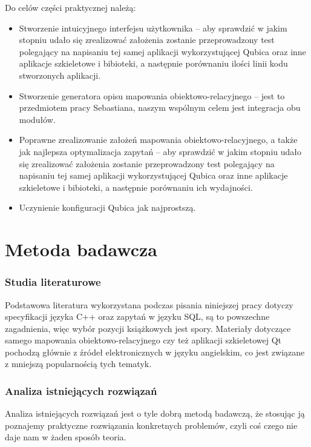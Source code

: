 \documentclass[12pt]{report}
\begin{document}
Do celów części praktycznej należą:

\begin{itemize}
\item Stworzenie intuicyjnego interfejsu użytkownika -- aby sprawdzić w jakim stopniu udało się zrealizować założenia zostanie przeprowadzony test po\-le\-ga\-ją\-cy na napisaniu
tej samej aplikacji wykorzystującej Qubica oraz inne aplikacje szkieletowe i bibioteki, a następnie porównaniu ilości linii kodu stworzonych aplikacji.
\item Stworzenie generatora opisu mapowania obiektowo-relacyjnego -- jest to przed\-mio\-tem pracy Sebastiana, naszym wspólnym celem jest integracja obu modułów.
\item Poprawne zrealizowanie założeń mapowania obiektowo-relacyjnego, a także jak najlepsza optymalizacja zapytań -- aby sprawdzić w jakim stopniu udało się zrealizować
założenia zostanie przeprowadzony test polegający na napisaniu tej samej aplikacji wykorzystującej Qubica oraz inne aplikacje szkieletowe i bibioteki, a następnie porównaniu
ich wydajności.
\item Uczynienie konfiguracji Qubica jak najprostszą.
\end{itemize}

\section{Metoda badawcza}

\subsubsection{Studia literaturowe} %

Podstawowa literatura wykorzystana podczas pisania niniejszej pracy dotyczy specyfikacji języka C++ oraz zapytań w języku SQL, są to powszechne zagadnienia, więc wybór
pozycji książkowych jest spory. Materiały dotyczące samego mapowania obiektowo-relacyjnego czy też aplikacji szkieletowej Qt pochodzą głównie z źródeł elektronicznych w 
języku angielskim, co jest związane z mniejszą popularnością tych tematyk.

\subsubsection{Analiza istniejących rozwiązań}

Analiza istniejących rozwiązań jest o tyle dobrą metodą badawczą, że stosując ją poznajemy praktyczne rozwiązania konkretnych problemów, czyli coś czego nie daje nam w
żaden sposób teoria.
\end{document}
